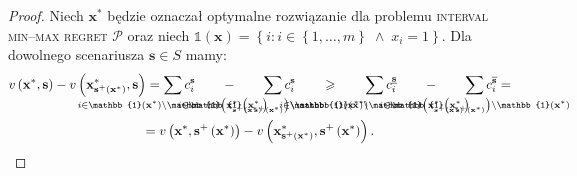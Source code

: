 \begin{proof}
	Niech $\textbf{x}^{\ast}$ będzie oznaczał optymalne rozwiązanie dla problemu \textsc{interval min--max regret $\mathcal{P}$} oraz niech $\mathbb{1} \left( \textbf{x} \right) = \left\{ i : i \in \left\{ 1, \dots, m \right\} \; \wedge \; x_{i} = 1 \right\}$. Dla dowolnego scenariusza $\textbf{s} \in S$ mamy:
	\begin{gather*}
		v \left( \textbf{x}^{\ast}, \textbf{s} \right) - v \left( \textbf{x}^{\ast}_{\textbf{s}^{+} \left( \textbf{x}^{\ast} \right)}, \textbf{s} \right) = \sum_{\mathclap{i \in \mathbb{1} \left( \textbf{x}^{\ast} \right) \setminus \mathbb{1} \left( \textbf{x}^{\ast}_{\textbf{s}^{+} \left( \textbf{x}^{\ast} \right)} \right)}} c_{i}^{\textbf{s}} \qquad - \qquad \sum_{\mathclap{i \in \mathbb{1} \left( \textbf{x}^{\ast}_{\textbf{s}^{+} \left( \textbf{x}^{\ast} \right)} \right) \setminus \mathbb{1} \left( \textbf{x}^{\ast} \right)}} c_{i}^{\textbf{s}} \qquad \geqslant \qquad \sum_{\mathclap{i \in \mathbb{1} \left( \textbf{x}^{\ast} \right) \setminus \mathbb{1} \left( \textbf{x}^{\ast}_{\textbf{s}^{+} \left( \textbf{x}^{\ast} \right)} \right)}} c^{\underline{\textbf{s}}}_{i} \qquad - \qquad \sum_{\mathclap{i \in \mathbb{1} \left( \textbf{x}^{\ast}_{\textbf{s}^{+} \left( \textbf{x}^{\ast} \right)} \right) \setminus \mathbb{1} \left( \textbf{x}^{\ast} \right)}} c^{\overline{\textbf{s}}}_{i} = \\
		= v \left( \textbf{x}^{\ast}, \textbf{s}^{+} \left( \textbf{x}^{\ast} \right) \right) - v \left( \textbf{x}^{\ast}_{\textbf{s}^{+} \left( \textbf{x}^{\ast} \right)}, \textbf{s}^{+} \left( \textbf{x}^{\ast} \right) \right)\text{.}
	\end{gather*}
	

\end{proof}
